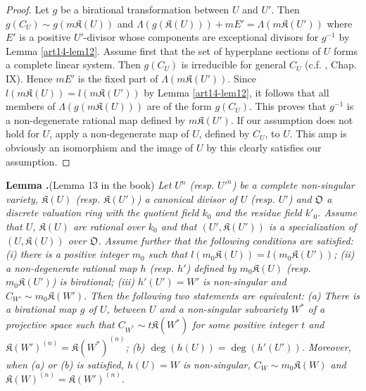 \begin{proof}
Let $g$ be a birational transformation between $U$ and $U'$. Then $g(C_{U})\sim g(m\mathfrak{K}(U))$ and $\Lambda(g(\mathfrak{K}(U)))+mE'=\Lambda(m\mathfrak{K}(U'))$ where $E'$ is a positive $U'$-divisor whose components are exceptional divisors for $g^{-1}$ by Lemma \ref{art14-lem12}. Assume first that the set of hyperplane sections of $U$ forms a complete linear system. Then $g(C_{U})$ is irreducible for general $C_{U}$ (c.f. \cite{art14-key25}, Chap. IX). Hence $mE'$ is the fixed part of $\Lambda(m\mathfrak{K}(U'))$. Since $l(m\mathfrak{K}(U))=l(m\mathfrak{K}(U'))$ by Lemma \ref{art14-lem12}, it follows that all members of $\Lambda(g(m\mathfrak{K}(U)))$ are of the form $g(C_{U})$. This proves that $g^{-1}$ is a non-degenerate rational map defined by $m\mathfrak{K}(U')$. If our assumption does not hold for $U$, apply a non-degenerate map of $U$, defined by $C_{U}$, to $U$. This amp is obviously an isomorphism and the image of $U$ by this clearly satisfies our assumption.
\end{proof}

\medskip
\noindent
{\bf Lemma .\label{art14-lem14}}(Lemma 13 in the book)
{\em Let $U^{n}$ (resp. ${U'}^{n}$) be a complete non-singular variety, $\mathfrak{K}(U)$ (resp. $\mathfrak{K}(U')$) a canonical divisor of $U$ (resp. $U'$) and $\mathfrak{O}$ a discrete valuation ring with the quotient field $k_{0}$ and the residue field $k'_{0}$. Assume that $U$, $\mathfrak{K}(U)$ are rational over $k_{0}$ and that $(U',\mathfrak{K}(U'))$ is a specialization of $(U,\mathfrak{K}(U))$ over $\mathfrak{O}$. Assume further that the following conditions are satisfied: {\rm(i)} there is a positive integer $m_{0}$ such that $l(m_{0}\mathfrak{K}(U))=l(m_{0}\mathfrak{K}(U'))$; {\rm(ii)} a non-degenerate rational map $h$ (resp. $h'$) defined by $m_{0}\mathfrak{K}(U)$ (resp. $m_{0}\mathfrak{K}(U')$) is birational; {\rm(iii)} $h'(U')=W'$ is non-singular and $C_{W'}\sim m_{0}\mathfrak{K}(W')$. Then the following two statements are equivalent: {\rm(a)} There is a birational map $g$ of $U$, between $U$ and a non-singular subvariety $W^{*}$ of a projective space such that $C_{W^{*}}\sim t\mathfrak{K}(W^{*})$ for some positive integer $t$ and $\mathfrak{K}(W')^{(n)}=\mathfrak{K}(W^{*})^{(n)}$; {\rm(b)} $\deg(h(U))=\deg (h'(U'))$. Moreover, when {\rm(a)} or {\rm(b)} is satisfied, $h(U)=W$ is non-singular, $C_{W}\sim m_{0}\mathfrak{K}(W)$ and $\mathfrak{K}(W)^{(n)}=\mathfrak{K}(W')^{(n)}$.}

